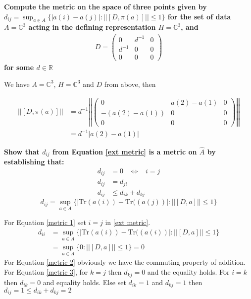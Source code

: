 \documentclass[a4paper]{article}
\newcounter{exercise}
\newenvironment{MyExercise}%
{\begin{mdframed}[style=exercisestyle]}{\end{mdframed}}
\theoremstyle{definition}
\theoremstyle{definition}
\theoremstyle{definition}
\theoremstyle{theorem}
\theoremstyle{theorem}
\begin{document}
\begin{MyExercise}
    \textbf{
	Compute the metric on the space of three points given by $d_{ij} =
	\sup_{a\in A}\{|a(i) - a(j)|: ||[D, \pi(a)]|| \leq 1\}$ for the set of data
    $A = \mathbb{C}^3$ acting in the defining representation $H = \mathbb{C}^3$, and
    \begin{align*}
    D =
    \begin{pmatrix}
        0 & d^{-1} & 0 \\
        d^{-1} & 0 & 0 \\
        0 & 0 & 0
    \end{pmatrix}
    \end{align*}
    for some $d \in \mathbb{R}$
}\newline

    We have $A=\mathbb{C}^3$, $H=\mathbb{C}^3$ and $D$ from above, then

    \begin{align}
        ||[D, \pi(a)]|| &= d^{-1}\left|\left|
    \begin{pmatrix}
        0 & a(2)-a(1) & 0 \\
        -(a(2)-a(1)) & 0 & 0 \\
        0 & 0 & 0
    \end{pmatrix} \right|\right| \\
        &= d^{-1} |a(2) - a(1)|
    \end{align}
\end{MyExercise}

\begin{MyExercise}
    \textbf{
    Show that $d_{ij}$ from Equation \ref{ext metric} is a metric on $\hat{A}$ by
    establishing that:
    \begin{align}
        d_{ij} &= 0\;\;\; \Leftrightarrow \;\;\; i=j \label{metric 1} \\
        d_{ij} &= d_{ji} \label{metric 2}\\
        d_{ij} &\leq d_{ik} + d_{kj} \label{metric 3}
    \end{align}
    \begin{equation} \label{ext metric}
        d_{ij} = \sup_{a\in A}\big\{|\text{Tr}(a(i)) - \text{Tr}((a(j))|: ||[D, a]|| \leq 1\big\}
    \end{equation}
}\newline

For Equation \ref{metric 1} set $i=j$ in \ref{ext metric}.
\begin{align*}
    d_{ii} &= \sup_{a \in A}\{|\text{Tr}(a(i)) - \text{Tr}((a(i))|: ||[D, a]|| \leq
    1\big\} \\
    &= \sup_{a \in A}\{0: ||[D, a]|| \leq 1\big\} = 0
\end{align*}
For Equation \ref{metric 2} obviously we have the commuting property of
addition.
\newline
For Equation \ref{metric 3}, for $k=j$ then $d_{kj} = 0$ and the equality
holds. For $i = k$ then $d_{ik} = 0$ and equality holds. Else set $d_{ik} =
1$ and $d_{kj} = 1$ then $d_{ij} = 1 \leq d_{ik} + d_{kj} = 2$
\end{MyExercise}
\end{document}
